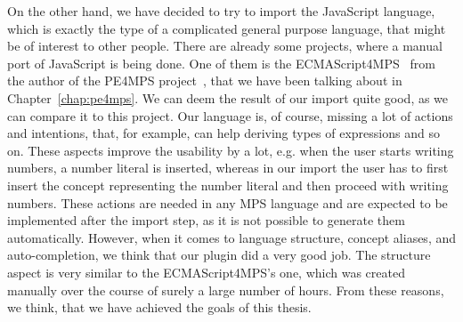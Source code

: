 On the other hand, we have decided to try to import the JavaScript language, which is exactly the type of a complicated general purpose language, that might be of interest to other people.
There are already some projects, where a manual port of JavaScript is being done.
One of them is the ECMAScript4MPS~\cite{ECMAScript4MPS} from the author of the PE4MPS project~\cite{PE4MPS}, that we have been talking about in Chapter~\ref{chap:pe4mps}.
We can deem the result of our import quite good, as we can compare it to this project.
Our language is, of course, missing a lot of actions and intentions, that, for example, can help deriving types of expressions and so on.
These aspects improve the usability by a lot, e.g. when the user starts writing numbers, a number literal is inserted, whereas in our import the user has to first insert the concept representing the number literal and then proceed with writing numbers.
These actions are needed in any MPS language and are expected to be implemented after the import step, as it is not possible to generate them automatically.
However, when it comes to language structure, concept aliases, and auto-completion, we think that our plugin did a very good job.
The structure aspect is very similar to the ECMAScript4MPS's one, which was created manually over the course of surely a large number of hours.
From these reasons, we think, that we have achieved the goals of this thesis.
